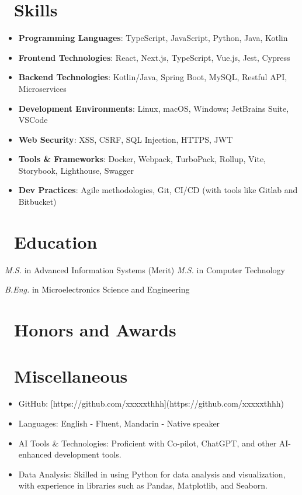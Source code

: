 \documentclass{resume}
\begin{document}
\section{\faCogs\ Skills}
\begin{itemize}[parsep=0.5ex]
  \item \textbf{Programming Languages}: TypeScript, JavaScript, Python, Java, Kotlin
  \item \textbf{Frontend Technologies}: React, Next.js, TypeScript, Vue.js, Jest, Cypress
  \item \textbf{Backend Technologies}: Kotlin/Java, Spring Boot, MySQL, Restful API, Microservices
  \item \textbf{Development Environments}: Linux, macOS, Windows; JetBrains Suite, VSCode
  \item \textbf{Web Security}: XSS, CSRF, SQL Injection, HTTPS, JWT
  \item \textbf{Tools \& Frameworks}: Docker, Webpack, TurboPack, Rollup, Vite, Storybook, Lighthouse, Swagger 
  \item \textbf{Dev Practices}: Agile methodologies, Git, CI/CD (with tools like Gitlab and Bitbucket)
\end{itemize}

\section{\faGraduationCap\ Education}
\textit{M.S.} in Advanced Information Systems (Merit)
\textit{M.S.} in Computer Technology

\textit{B.Eng.} in Microelectronics Science and Engineering

\section{\faHeartO\ Honors and Awards}

\section{\faInfo\ Miscellaneous}
\begin{itemize}[parsep=0.5ex]
  \item GitHub: [https://github.com/xxxxxthhh](https://github.com/xxxxxthhh)
  \item Languages: English - Fluent, Mandarin - Native speaker
  \item AI Tools \& Technologies: Proficient with Co-pilot, ChatGPT, and other AI-enhanced development tools.
  \item Data Analysis: Skilled in using Python for data analysis and visualization, with experience in libraries such as Pandas, Matplotlib, and Seaborn.
\end{itemize}
\end{document}
